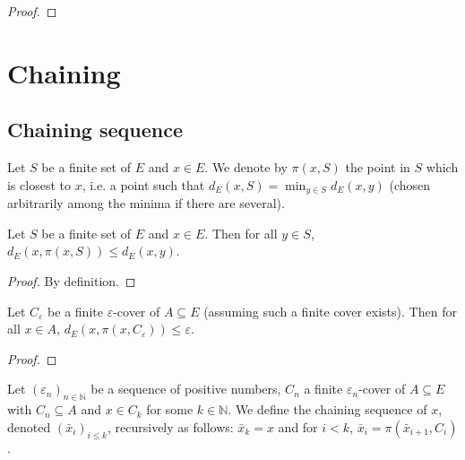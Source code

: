 \begin{proof}\leanok

\end{proof}


\section{Chaining}

\subsection{Chaining sequence}


\begin{definition}\label{def:nearestPt}
  \leanok
Let $S$ be a finite set of $E$ and $x \in E$.
We denote by $\pi(x, S)$ the point in $S$ which is closest to $x$, i.e. a point such that $d_E(x, S) = \min_{y \in S} d_E(x, y)$ (chosen arbitrarily among the minima if there are several).
\end{definition}


\begin{lemma}\label{lem:dist_nearestPt_le}
  \leanok
Let $S$ be a finite set of $E$ and $x \in E$.
Then for all $y \in S$, $d_E(x, \pi(x, S)) \le d_E(x, y)$.
\end{lemma}

\begin{proof}\leanok
By definition.
\end{proof}


\begin{lemma}\label{lem:dist_nearestPt_of_isCover}
  \leanok
Let $C_\varepsilon$ be a finite $\varepsilon$-cover of $A \subseteq E$ (assuming such a finite cover exists).
Then for all $x \in A$, $d_E(x, \pi(x, C_\varepsilon)) \le \varepsilon$.
\end{lemma}

\begin{proof}\leanok

\end{proof}


\begin{definition}\label{def:chainingSequence}
  \leanok
Let $(\varepsilon_n)_{n \in \mathbb{N}}$ be a sequence of positive numbers, $C_n$ a finite $\varepsilon_n$-cover of $A \subseteq E$ with $C_n \subseteq A$ and $x \in C_k$ for some $k \in \mathbb{N}$.
We define the chaining sequence of $x$, denoted $(\bar{x}_i)_{i \le k}$, recursively as follows: $\bar{x}_k = x$ and for $i < k$, $\bar{x}_i = \pi(\bar{x}_{i+1}, C_i)$.
\end{definition}


